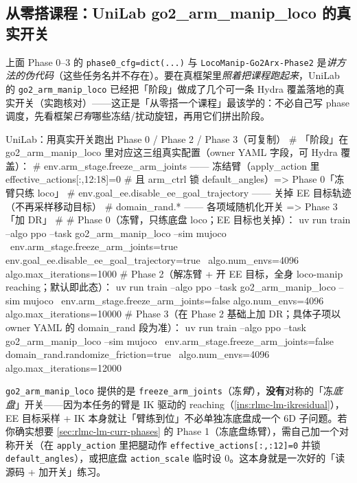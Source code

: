 \subsection{从零搭课程：UniLab go2\_arm\_manip\_loco 的真实开关}
\label{sec:rlmc-lm-curr-unilab}

上面 Phase 0--3 的 \verb|phase0_cfg=dict(...)| 与 \verb|LocoManip-Go2Arx-Phase2| 是\emph{讲方法的伪代码}（这些任务名并不存在）。要在真框架里\emph{照着把课程跑起来}，UniLab 的 \verb|go2_arm_manip_loco| 已经把「阶段」做成了几个可一条 Hydra 覆盖落地的真实开关（实跑核对）——这正是「从零搭一个课程」最该学的：不必自己写 phase 调度，先看框架\emph{已有}哪些冻结/扰动旋钮，再用它们拼出阶段。

\begin{codebox}[bash]{UniLab：用真实开关跑出 Phase 0 / Phase 2 / Phase 3（可复制）}
# 「阶段」在 go2_arm_manip_loco 里对应这三组真实配置（owner YAML 字段，可 Hydra 覆盖）：
#   env.arm_stage.freeze_arm_joints   —— 冻结臂（apply_action 里 effective_actions[:,12:18]=0
#                                          且 arm_ctrl 锁 default_angles）=> Phase 0「冻臂只练 loco」
#   env.goal_ee.disable_ee_goal_trajectory —— 关掉 EE 目标轨迹（不再采样移动目标）
#   domain_rand.*                     —— 各项域随机化开关 => Phase 3「加 DR」
#
# Phase 0（冻臂，只练底盘 loco；EE 目标也关掉）：
uv run train --algo ppo --task go2_arm_manip_loco --sim mujoco \
    env.arm_stage.freeze_arm_joints=true env.goal_ee.disable_ee_goal_trajectory=true \
    algo.num_envs=4096 algo.max_iterations=1000
# Phase 2（解冻臂 + 开 EE 目标，全身 loco-manip reaching；默认即此态）：
uv run train --algo ppo --task go2_arm_manip_loco --sim mujoco \
    env.arm_stage.freeze_arm_joints=false algo.num_envs=4096 algo.max_iterations=10000
# Phase 3（在 Phase 2 基础上加 DR；具体子项以 owner YAML 的 domain_rand 段为准）：
uv run train --algo ppo --task go2_arm_manip_loco --sim mujoco \
    env.arm_stage.freeze_arm_joints=false domain_rand.randomize_friction=true \
    algo.num_envs=4096 algo.max_iterations=12000
\end{codebox}

\begin{note}[「Phase 1 冻底盘只练臂」在本任务里没有现成开关]
\verb|go2_arm_manip_loco| 提供的是 \verb|freeze_arm_joints|（冻\emph{臂}），\textbf{没有}对称的「冻\emph{底盘}」开关——因为本任务的臂是 IK 驱动的 reaching（\cref{ins:rlmc-lm-ikresidual}），EE 目标采样 + IK 本身就让「臂练到位」不必单独冻底盘成一个 $6$D 子问题。若你确实想要 \cref{sec:rlmc-lm-curr-phases} 的 Phase 1（冻底盘练臂），需自己加一个对称开关（在 \verb|apply_action| 里把腿动作 \verb|effective_actions[:,:12]=0| 并锁 \verb|default_angles|），或把底盘 \verb|action_scale| 临时设 $0$。这本身就是一次好的「读源码 + 加开关」练习。
\end{note}

